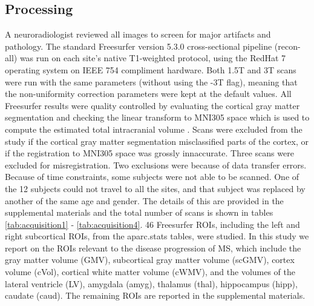 \subsection{Processing}
 A neuroradiologist reviewed all images to screen for major artifacts and pathology. The standard Freesurfer \cite{freesurferPaper} version 5.3.0 cross-sectional pipeline (recon-all) was run on each site's native T1-weighted protocol, using the RedHat 7 operating system on IEEE 754 compliment hardware. Both 1.5T and 3T scans were run with the same parameters (without using the -3T flag), meaning that the non-uniformity correction parameters were kept at the default values. All Freesurfer results were quality controlled by evaluating the cortical gray matter segmentation and checking the  linear transform to MNI305 space which is used to compute the estimated total intracranial volume \cite{buckner2004unified}. Scans were excluded from the study if the cortical gray matter segmentation misclassified parts of the cortex, or if the registration to MNI305 space was grossly innaccurate. Three scans were excluded for misregistration. Two exclusions were because of data transfer errors. Because of time constraints, some subjects were not able to be scanned. One of the 12 subjects could not travel to all the sites, and that subject was replaced by another of the same age and gender. The details of this are provided in the supplemental materials and the total number of scans is shown in tables \ref{tab:acquisition1} - \ref{tab:acquisition4}. 46 Freesurfer ROIs, including the left and right subcortical ROIs, from the aparc.stats tables, were studied. In this study we report on the ROIs relevant to the disease progression of MS, which include the gray matter volume (GMV), subcortical gray matter volume (scGMV), cortex volume (cVol), cortical white matter volume (cWMV), and the volumes of the lateral ventricle (LV), amygdala (amyg), thalamus (thal), hippocampus (hipp), caudate (caud). The remaining ROIs are reported in the supplemental materials. 